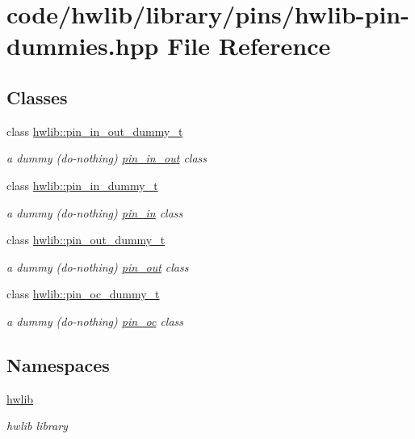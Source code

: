 \hypertarget{hwlib-pin-dummies_8hpp}{}\section{code/hwlib/library/pins/hwlib-\/pin-\/dummies.hpp File Reference}
\label{hwlib-pin-dummies_8hpp}
\subsection*{Classes}
\begin{DoxyCompactItemize}
\item 
class \hyperlink{classhwlib_1_1pin__in__out__dummy__t}{hwlib\+::pin\+\_\+in\+\_\+out\+\_\+dummy\+\_\+t}
\begin{DoxyCompactList}\small\item\em a dummy (do-\/nothing) \hyperlink{classhwlib_1_1pin__in__out}{pin\+\_\+in\+\_\+out} class \end{DoxyCompactList}\item 
class \hyperlink{classhwlib_1_1pin__in__dummy__t}{hwlib\+::pin\+\_\+in\+\_\+dummy\+\_\+t}
\begin{DoxyCompactList}\small\item\em a dummy (do-\/nothing) \hyperlink{classhwlib_1_1pin__in}{pin\+\_\+in} class \end{DoxyCompactList}\item 
class \hyperlink{classhwlib_1_1pin__out__dummy__t}{hwlib\+::pin\+\_\+out\+\_\+dummy\+\_\+t}
\begin{DoxyCompactList}\small\item\em a dummy (do-\/nothing) \hyperlink{classhwlib_1_1pin__out}{pin\+\_\+out} class \end{DoxyCompactList}\item 
class \hyperlink{classhwlib_1_1pin__oc__dummy__t}{hwlib\+::pin\+\_\+oc\+\_\+dummy\+\_\+t}
\begin{DoxyCompactList}\small\item\em a dummy (do-\/nothing) \hyperlink{classhwlib_1_1pin__oc}{pin\+\_\+oc} class \end{DoxyCompactList}\end{DoxyCompactItemize}
\subsection*{Namespaces}
\begin{DoxyCompactItemize}
\item 
 \hyperlink{namespacehwlib}{hwlib}
\begin{DoxyCompactList}\small\item\em hwlib library \end{DoxyCompactList}\end{DoxyCompactItemize}
